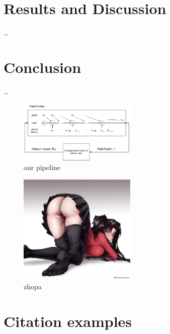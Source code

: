 \documentclass{article}
\begin{document}
\section{Results and Discussion}
\dots

\section{Conclusion}
\dots

\begin{figure}[H]
  \centering
    \includegraphics[width=0.5\textwidth]{./pictures/pipeline.png}
    \caption[our pipeline]{our pipeline}\label{fig:pipeline}
\end{figure}

\begin{figure}[H]
  \centering
    \includegraphics[width=0.5\textwidth]{./pictures/rin.jpg}
    \caption[zhopa]{zhopa}\label{fig:zhopa}
\end{figure}


\section{Citation examples}
\cite{Zhong2018}~\cite{Bartoli2016}~\cite{Bartoli2018}~\cite{Tariq2024}




\end{document}
